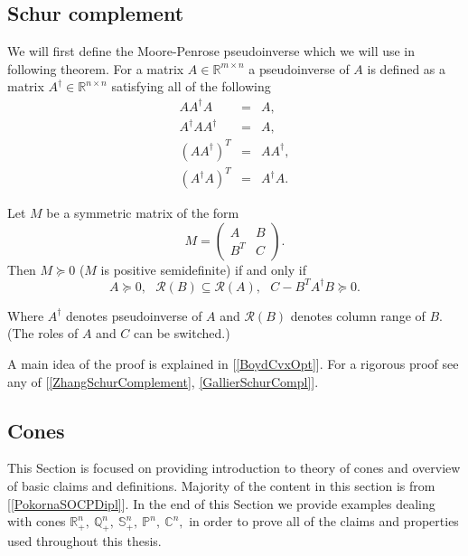 \documentclass[12pt]{book}
\theoremstyle{definition}
\begin{document}

\begin{appendix}


\chapter{ }
\section{Schur complement}

We will first define the Moore-Penrose pseudoinverse which we will use in following theorem.
\label{Pseudoinverse}
For a matrix $A\in\mathbb{R}^{m\times n}$ a pseudoinverse of $A$ is defined as a matrix $A^\dagger\in \mathbb{R}^{n\times n}$ satisfying all of the following
\begin{eqnarray*}
AA^\dagger A \ &=& A,\\
A^\dagger A A^\dagger &=& A,\\
(AA^\dagger)^T &=& AA^\dagger,\\
(A^\dagger A)^T &=& A^\dagger A.
\end{eqnarray*}

\label{SchurCompl}
Let $M$ be a symmetric matrix of the form
$$M = \left(\begin{array}{cc}
A & B\\
B^T & C
\end{array}\right).$$ 
Then $M\succeq 0$ ($M$ is positive semidefinite) if and only if 
$$A\succeq 0, \ \ \ \mathcal{R}(B)\subseteq \mathcal{R}(A),\ \ \ C - B^TA^\dagger B \succeq 0.$$


Where $A^\dagger$ denotes pseudoinverse of $A$ and $\mathcal{R}(B)$ denotes column range of $B$. (The roles of $A$ and $C$ can be switched.)\rm 

\proof A main idea of the proof is explained in [\ref{BoydCvxOpt}]. For a rigorous proof see any of [\ref{ZhangSchurComplement}, \ref{GallierSchurCompl}].


\section{Cones}
\label{Cones}
This Section is focused on providing introduction to theory of cones and overview of basic claims and definitions.
Majority of the content in this section is from [\ref{PokornaSOCPDipl}]. In the end of this Section we provide examples dealing with cones $\mathbb{R}^n_+,\ \mathbb{Q}^n_+,\ \mathbb{S}^n_+, \ \mathbb{P}^n,\ \mathbb{C}^n,$  in order to prove all of the claims and properties used throughout this thesis.


\end{appendix}
\end{document}

